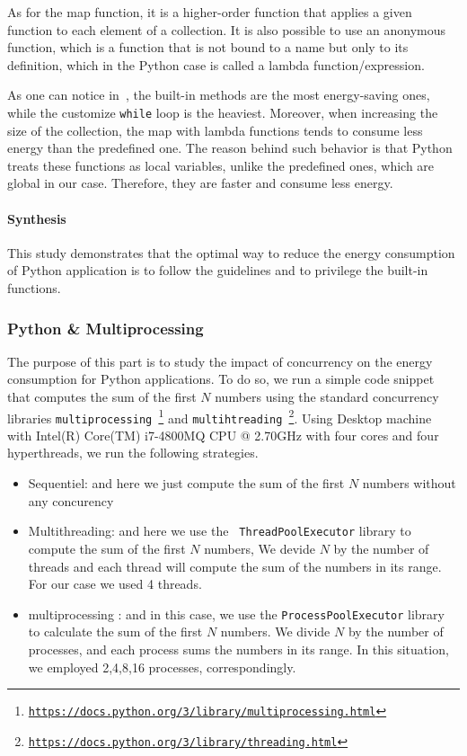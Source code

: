As for the map function, it is a higher-order function that applies a given function to each element of a collection. It is also possible to use an anonymous function, which is a function that is not bound to a name but only to its definition, which in the Python case is called a lambda function/expression.

As one can notice in~, the built-in methods are the most energy-saving ones, while the customize \texttt{while} loop is the heaviest.
Moreover, when increasing the size of the collection, the map with lambda functions tends to consume less energy than the predefined one.
The reason behind such behavior is that Python treats these functions as local variables, unlike the predefined ones, which are global in our case. Therefore, they are faster and consume less energy.


\paragraph*{Synthesis}
This study demonstrates that the optimal way to reduce the energy consumption of Python application is to follow the guidelines and to privilege the built-in functions.


\subsubsection{Python \& Multiprocessing}
The purpose of this part is to study the impact of concurrency on the energy consumption for Python applications.
To do so, we run a simple code snippet that computes the sum of the first $N$ numbers using the standard concurrency libraries \texttt{multiprocessing~\footnote{\url{https://docs.python.org/3/library/multiprocessing.html}}} and \texttt{multihtreading~\footnote{\url{https://docs.python.org/3/library/threading.html}}}. Using Desktop  machine with Intel(R) Core(TM) i7-4800MQ CPU @ 2.70GHz with four cores and four hyperthreads, we run the following strategies.
\begin{itemize}
    \item Sequentiel: and here we just compute the sum of the first $N$ numbers without any concurency
    \item Multithreading: and here we use the \texttt{ ThreadPoolExecutor} library to compute the sum of the first $N$ numbers, We devide $N$ by the number of threads and each thread will compute the sum of the numbers in its range. For our case we used 4 threads.
    \item multiprocessing : and in this case, we use the \texttt{ProcessPoolExecutor} library to calculate the sum of the first $N$ numbers. We divide $N$ by the number of processes, and each process sums the numbers in its range. In this situation, we employed 2,4,8,16 processes, correspondingly.
\end{itemize}


